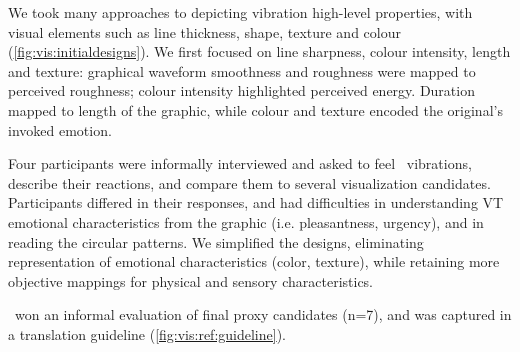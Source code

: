   We took many approaches to depicting vibration high-level properties, with visual elements such as line thickness, shape, texture and colour (\autoref{fig:vis:initialdesigns}).
        We first focused on line sharpness, colour intensity, length and texture:
        graphical waveform smoothness and roughness were mapped to perceived roughness; 
        colour intensity highlighted  perceived energy.
        Duration mapped to length of the graphic, while colour and texture encoded the original's invoked emotion.

    Four participants were informally interviewed and asked to feel \hifi~vibrations, describe their reactions, and compare them to several visualization  candidates.
         Participants differed in their responses, and  had difficulties in understanding VT emotional characteristics from the graphic (i.e. pleasantness, urgency), and in reading the circular patterns. 
       We simplified the designs, eliminating representation of emotional characteristics (color, texture), while retaining more objective mappings for physical and sensory characteristics. %
       
       \linear~won an informal evaluation of final proxy candidates (n=7), and was captured in a translation guideline
       (\autoref{fig:vis:ref:guideline}).
     
    
     
